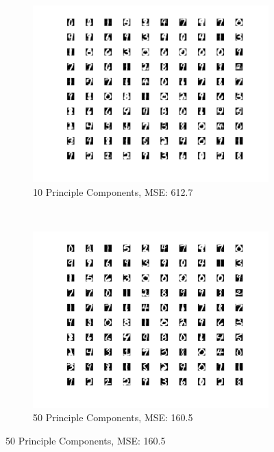 \documentclass{article}
\begin{document}
\begin{figure}[t!]
    \centering
    \begin{subfigure}{0.45\textwidth}
        \centering
        \includegraphics[width=\textwidth]{../pca_10.png}
        \caption{10 Principle Components, MSE: 612.7}
    \end{subfigure}%
    ~
    \begin{subfigure}{0.45\textwidth}
        \centering
        \includegraphics[width=\textwidth]{../pca_50.png}
        \caption{50 Principle Components, MSE: 160.5}
    \end{subfigure}
\end{figure}
\end{document}
